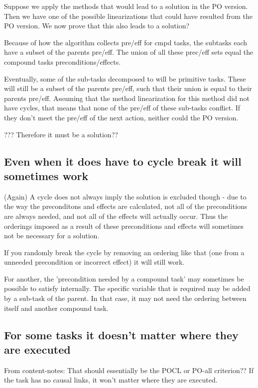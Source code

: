 	Suppose we apply the methods that would lead to a solution in the PO version. Then we have one of the possible linearizations that could have resulted
	from the PO version. We now prove that this also leads to a solution?
	
	Because of how the algorithm collects pre/eff for cmpd tasks, the subtasks each have a subset of the parents pre/eff. The union of all these prec/eff sets equal the compound tasks preconditions/effects.
	
	Eventually, some of the sub-tasks decomposed to will be primitive tasks. These will still be a subset of the parents pre/eff, such that their union is equal to their parents pre/eff.
	Assuming that the method linearization for this method did not have cycles, that means that none of the pre/eff of these sub-tasks conflict.
	If they don't meet the pre/eff of the next action, neither could the PO version. 
	
	???
	Therefore it must be a solution??
	
	
	
\subsection{Even when it does have to cycle break it will sometimes work}
(Again) A cycle does not always imply the solution is excluded though - due to the way the preconditons and effects are calculated, not all of the preconditions are always needed,	and not all of the effects will actually occur.  Thus the orderings imposed as a result of these preconditions and effects will sometimes not be necessary for a solution.

If you randomly break the cycle by removing an ordering like that (one from a unneeded precondition or incorrect effect) it will still work.


For another, the 'precondition needed by a compound task' may sometimes be possible to satisfy internally. The specific variable
that is required may be added by a sub-task of the parent. In that case, it may not need the ordering between itself and another compound task.


\subsection{For some tasks it doesn't matter where they are executed}
From content-notes: That should essentially be the POCL or PO-all criterion??
If the task has no causal links, it won't matter where they are executed.

